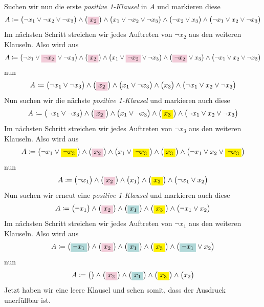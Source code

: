 \documentclass{scrreprt}
\begin{document}
\begin{enumerate}[(a)]
  Suchen wir nun die erste \emph{positive 1-Klausel} in $A$ und markieren diese
  \[
    A \coloneqq \qty\big(\neg x_1 \lor \neg x_2 \lor \neg x_3) \land
    \qty\big(\colorbox{purple!20}{$x_2$}) \land
    \qty\big(x_1 \lor \neg x_2 \lor \neg x_3) \land
    \qty\big(\neg x_2 \lor x_3) \land
    \qty\big(\neg x_1 \lor x_2 \lor \neg x_3)
  \]
  Im nächsten Schritt streichen wir jedes Auftreten von $\neg x_2$ aus den
  weiteren Klauseln.
  Also wird aus
  \[
    A \coloneqq \qty\big(\neg x_1 \lor \colorbox{purple!20}{$\neg x_2$} \lor \neg x_3) \land
    \qty\big(\colorbox{purple!20}{$x_2$}) \land
    \qty\big(x_1 \lor \colorbox{purple!20}{$\neg x_2$} \lor \neg x_3) \land
    \qty\big(\colorbox{purple!20}{$\neg x_2$} \lor x_3) \land
    \qty\big(\neg x_1 \lor x_2 \lor \neg x_3)
  \]
  nun
  \[
    A \coloneqq \qty\big(\neg x_1 \lor \neg x_3) \land
    \qty\big(\colorbox{purple!20}{$x_2$}) \land
    \qty\big(x_1 \lor \neg x_3) \land
    \qty\big(x_3) \land
    \qty\big(\neg x_1 \lor x_2 \lor \neg x_3)
  \]
  Nun suchen wir die nächste \emph{positive 1-Klausel} und markieren auch diese
  \[
    A \coloneqq \qty\big(\neg x_1 \lor \neg x_3) \land
    \qty\big(\colorbox{purple!20}{$x_2$}) \land
    \qty\big(x_1 \lor \neg x_3) \land
    \qty\big(\colorbox{yellow}{$x_3$}) \land
    \qty\big(\neg x_1 \lor x_2 \lor \neg x_3)
  \]
  Im nächsten Schritt streichen wir jedes Auftreten von $\neg x_3$ aus den
  weiteren Klauseln.
  Also wird aus
  \[
    A \coloneqq \qty\big(\neg x_1 \lor \colorbox{yellow}{$\neg x_3$}) \land
    \qty\big(\colorbox{purple!20}{$x_2$}) \land
    \qty\big(x_1 \lor \colorbox{yellow}{$\neg x_3$}) \land
    \qty\big(\colorbox{yellow}{$x_3$}) \land
    \qty\big(\neg x_1 \lor x_2 \lor \colorbox{yellow}{$\neg x_3$})
  \]
  nun
  \[
    A \coloneqq \qty\big(\neg x_1) \land
    \qty\big(\colorbox{purple!20}{$x_2$}) \land
    \qty\big(x_1) \land
    \qty\big(\colorbox{yellow}{$x_3$}) \land
    \qty\big(\neg x_1 \lor x_2)
  \]
  Nun suchen wir erneut eine \emph{positive 1-Klausel} und markieren auch diese
  \[
    A \coloneqq \qty\big(\neg x_1) \land
    \qty\big(\colorbox{purple!20}{$x_2$}) \land
    \qty\big(\colorbox{teal!30}{$x_1$}) \land
    \qty\big(\colorbox{yellow}{$x_3$}) \land
    \qty\big(\neg x_1 \lor x_2)
  \]
  Im nächsten Schritt streichen wir jedes Auftreten von $\neg x_1$ aus den
  weiteren Klauseln.
  Also wird aus
  \[
    A \coloneqq \qty\big(\colorbox{teal!30}{$\neg x_1$}) \land
    \qty\big(\colorbox{purple!20}{$x_2$}) \land
    \qty\big(\colorbox{teal!30}{$x_1$}) \land
    \qty\big(\colorbox{yellow}{$x_3$}) \land
    \qty\big(\colorbox{teal!30}{$\neg x_1$} \lor x_2)
  \]
  nun
  \[
    A \coloneqq \qty\big() \land
    \qty\big(\colorbox{purple!20}{$x_2$}) \land
    \qty\big(\colorbox{teal!30}{$x_1$}) \land
    \qty\big(\colorbox{yellow}{$x_3$}) \land
    \qty\big(x_2)
  \]
  Jetzt haben wir eine leere Klausel und sehen somit, dass der Ausdruck
  unerfüllbar ist.


\end{enumerate}
\end{document}
